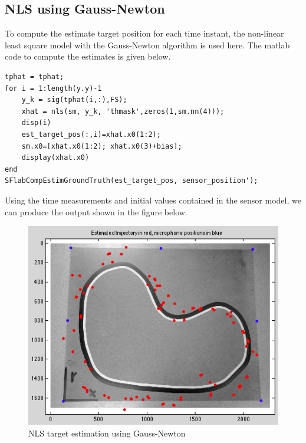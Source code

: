 \documentclass[10pt,a4paper]{report}
\begin{document}
\subsection{NLS using Gauss-Newton}
\label{lacalisation Gauss}
To compute the estimate target position for each time instant, the non-linear least square model with the Gauss-Newton algorithm is used here. The matlab code to compute the estimates is given below.
\begin{verbatim}
tphat = tphat;
for i = 1:length(y.y)-1
    y_k = sig(tphat(i,:),FS);
    xhat = nls(sm, y_k, 'thmask',zeros(1,sm.nn(4)));
    disp(i)
    est_target_pos(:,i)=xhat.x0(1:2);
    sm.x0=[xhat.x0(1:2); xhat.x0(3)+bias];
    display(xhat.x0)
end
SFlabCompEstimGroundTruth(est_target_pos, sensor_position');
\end{verbatim}
Using the time measurements and initial values contained in the sensor model, we can produce the output shown in the figure below.
\begin{figure}[H]
  \includegraphics[width = 350pt]{NLS_target_est.png}
  \caption{NLS target estimation using Gauss-Newton}
  \label{NLS_target_est}
\end{figure}



\newpage
\end{document}
